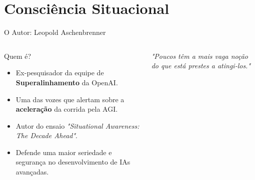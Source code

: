 \documentclass[aspectratio=169,12pt]{beamer}
\begin{document}

\section{Consciência Situacional}

\begin{frame}{O Autor: Leopold Aschenbrenner}
    \begin{columns}
        \begin{column}{0.6\textwidth}
            \begin{block}{Quem é?}
                \begin{itemize}
                    \item Ex-pesquisador da equipe de \textbf{Superalinhamento} da OpenAI.
                    \item Uma das vozes que alertam sobre a \textbf{aceleração} da corrida pela AGI.
                    \item Autor do ensaio \textit{"Situational Awareness: The Decade Ahead"}.
                    \item Defende uma maior seriedade e segurança no desenvolvimento de IAs avançadas.
                \end{itemize}
            \end{block}
        \end{column}
        \begin{column}{0.4\textwidth}
            \begin{center}
                {\Huge \faUserSecret}

                \vspace{1cm}
                
                \textit{"Poucos têm a mais vaga noção do que está prestes a atingi-los."}
            \end{center}
        \end{column}
    \end{columns}
\end{frame}
\end{document}
